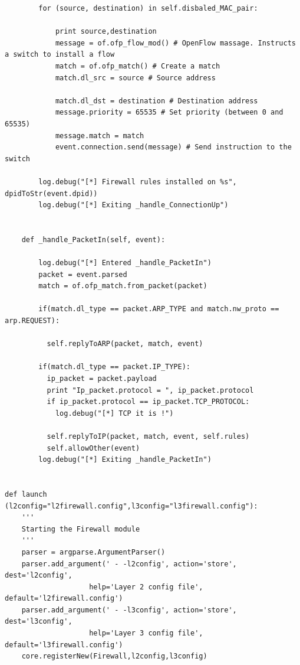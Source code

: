 \begin{verbatim}
		for (source, destination) in self.disbaled_MAC_pair:

			print source,destination
			message = of.ofp_flow_mod() # OpenFlow massage. Instructs a switch to install a flow
			match = of.ofp_match() # Create a match
			match.dl_src = source # Source address

			match.dl_dst = destination # Destination address
			message.priority = 65535 # Set priority (between 0 and 65535)
			message.match = match			
			event.connection.send(message) # Send instruction to the switch

		log.debug("[*] Firewall rules installed on %s", dpidToStr(event.dpid))
		log.debug("[*] Exiting _handle_ConnectionUp")


	def _handle_PacketIn(self, event):

		log.debug("[*] Entered _handle_PacketIn")
		packet = event.parsed
		match = of.ofp_match.from_packet(packet)

		if(match.dl_type == packet.ARP_TYPE and match.nw_proto == arp.REQUEST):

		  self.replyToARP(packet, match, event)

		if(match.dl_type == packet.IP_TYPE):
		  ip_packet = packet.payload
		  print "Ip_packet.protocol = ", ip_packet.protocol
		  if ip_packet.protocol == ip_packet.TCP_PROTOCOL:
			log.debug("[*] TCP it is !")
   
		  self.replyToIP(packet, match, event, self.rules)
		  self.allowOther(event)
		log.debug("[*] Exiting _handle_PacketIn")


def launch (l2config="l2firewall.config",l3config="l3firewall.config"):
	'''
	Starting the Firewall module
	'''
	parser = argparse.ArgumentParser()
	parser.add_argument(' - -l2config', action='store', dest='l2config',
					help='Layer 2 config file', default='l2firewall.config')
	parser.add_argument(' - -l3config', action='store', dest='l3config',
					help='Layer 3 config file', default='l3firewall.config')
	core.registerNew(Firewall,l2config,l3config)
\end{verbatim}